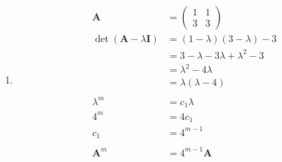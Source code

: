 \documentclass{article}
\begin{document}
\setcounter{subsubsection}{12}
\subsubsection{}

\begin{enumerate}
  \item

        \begin{align*}
          \mathbf{A}                             & = \begin{pmatrix}
                                                       1 & 1 \\
                                                       3 & 3
                                                     \end{pmatrix}                          \\
          \det (\mathbf{A} - \lambda \mathbf{I}) & = (1 - \lambda) (3 - \lambda) - 3         \\
                                                 & = 3 - \lambda - 3 \lambda + \lambda^2 - 3 \\
                                                 & = \lambda^2 - 4 \lambda                   \\
                                                 & = \lambda (\lambda - 4)                   \\ \\
          \lambda^m                              & = c_1 \lambda                             \\
          4^m                                    & = 4 c_1                                   \\
          c_1                                    & = 4^{m - 1}                               \\ \\
          \mathbf{A}^m                           & = 4^{m - 1} \mathbf{A}
        \end{align*}
\end{enumerate}

\setcounter{subsubsection}{14}
\subsubsection{}
\end{document}
